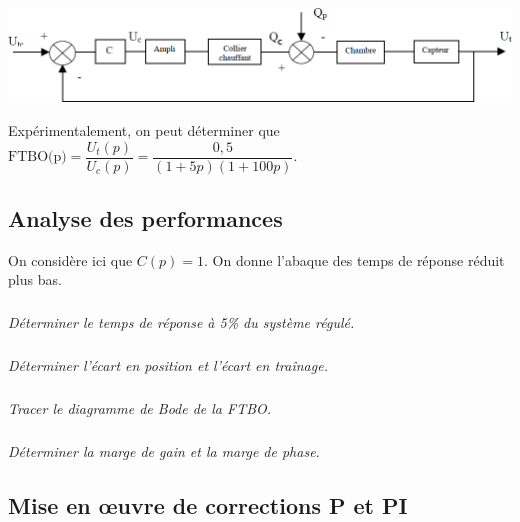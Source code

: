 \documentclass[10pt,fleqn]{article} %
\begin{document}
\begin{multicols}{2}
\begin{center}
\includegraphics[width=\linewidth]{images/fig_03}
\end{center}
%
%
%
%
%

Expérimentalement, on peut déterminer que $\text{FTBO(p)}=\dfrac{U_t(p)}{U_c(p)}=\dfrac{0,5}{\left(1+5 p \right)\left(1+100 p \right)}$.

\subsection*{Analyse des performances}
On considère ici que $C(p)=1$. On donne l'abaque des temps de réponse réduit plus bas.

\subparagraph{}\textit{Déterminer le temps de réponse à 5\% du système régulé.}
\subparagraph{}\textit{Déterminer l'écart en position et l'écart en traînage.}

\subparagraph{}\textit{Tracer le diagramme de Bode de la FTBO.}

\subparagraph{}\textit{Déterminer la marge de gain et la marge de phase.}

\subsection*{Mise en \oe{}uvre de corrections P et PI}


\end{multicols}
\end{document}
